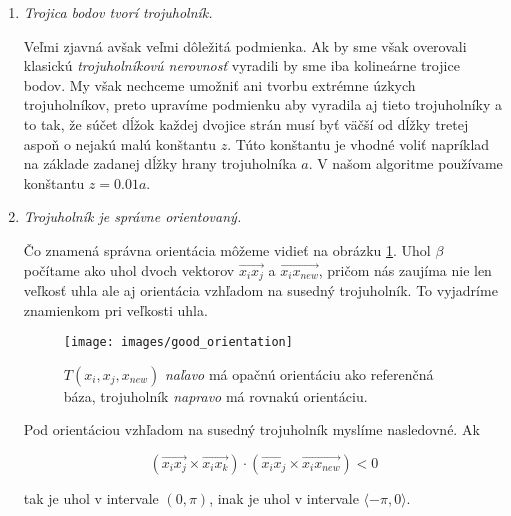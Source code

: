 \begin{enumerate}
    \item{
        \textit{Trojica bodov tvorí trojuholník.}


        Veľmi zjavná avšak veľmi dôležitá podmienka. Ak by sme však overovali klasickú 
        \textit{trojuholníkovú nerovnosť} vyradili by sme iba kolineárne trojice bodov. My však nechceme 
        umožniť ani tvorbu extrémne úzkych trojuholníkov, preto upravíme podmienku aby vyradila aj tieto
        trojuholníky a to tak, že súčet dĺžok každej dvojice strán musí byť väčší od dĺžky tretej aspoň
        o nejakú malú konštantu $z$. Túto konštantu je vhodné voliť napríklad na základe zadanej dĺžky 
        hrany trojuholníka $a$. V našom algoritme používame konštantu $z = 0.01 a$. 
    } 

    \item{
        \textit{Trojuholník je správne orientovaný.}


        Čo znamená správna orientácia môžeme vidieť na obrázku \ref{obr:good_orientation}. Uhol $\beta$
        počítame ako uhol dvoch vektorov $\overrightarrow{x_i x_j}$ a $\overrightarrow{x_i x_{new}}$, 
        pričom nás zaujíma nie len veľkosť uhla ale aj orientácia vzhľadom na susedný trojuholník. To 
        vyjadríme znamienkom pri veľkosti uhla. 

        \begin{figure}
            \centerline{\texttt{[image: images/good\_orientation]}}
            \caption[Orientácia bázy vzhľadom na referenčnú bázu]
            {$T(x_i, x_j, x_{new})$ \textit{naľavo} má opačnú orientáciu ako referenčná báza, trojuholník \textit{napravo} má rovnakú orientáciu.}
            \label{obr:good_orientation}
        \end{figure}

        Pod orientáciou vzhľadom na susedný trojuholník myslíme nasledovné.
        Ak

        \begin{equation}
        \label{eq:vector_space_orientation}
        (\overrightarrow{x_i x_j} \times \overrightarrow{x_i x_k}) 
        \cdot (\overrightarrow{x_i x_j} \times \overrightarrow{x_i x_{new}}) < 0
        \end{equation}

        tak je uhol v intervale $(0, \pi)$, inak je uhol v intervale $ \langle -\pi, 0 \rangle$.
        
}
\end{enumerate}
